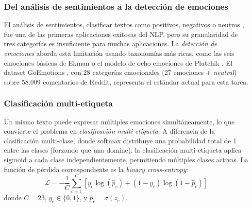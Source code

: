 \subsubsection{Del análisis de sentimientos a la detección de emociones}
\label{sec:sota-sentiment}

El análisis de sentimientos, clasificar textos como positivos, negativos o
neutros \cite{pang2008opinion}, fue una de las primeras aplicaciones exitosas
del NLP, pero su granularidad de tres categorías es insuficiente para muchas
aplicaciones. La \emph{detección de emociones} aborda esta limitación usando
taxonomías más ricas, como las seis emociones básicas de Ekman
\cite{ekman1992argument} o el modelo de ocho emociones de Plutchik
\cite{plutchik1980general}. El dataset GoEmotions \cite{demszky2020goemotions},
con 28 categorías emocionales (27 emociones + \textit{neutral}) sobre 58.009
comentarios de Reddit, representa el estándar actual para esta tarea.

\subsubsection{Clasificación multi-etiqueta}
\label{sec:sota-multilabel}

Un mismo texto puede expresar múltiples emociones simultáneamente, lo que convierte
el problema en \emph{clasificación multi-etiqueta}. A diferencia de la clasificación
multi-clase, donde softmax distribuye una probabilidad total de 1 entre las clases
(forzando que una domine), la clasificación multi-etiqueta aplica sigmoid a cada
clase independientemente, permitiendo múltiples clases activas. La función de
pérdida correspondiente es la \emph{binary cross-entropy}:
\begin{equation}
    \mathcal{L} = -\frac{1}{C} \sum_{c=1}^{C} \left[ y_c \log(\hat{p}_c) + (1 - y_c) \log(1 - \hat{p}_c) \right]
    \label{eq:bce}
\end{equation}
donde $C = 23$, $y_c \in \{0, 1\}$, y $\hat{p}_c = \sigma(z_c)$.

